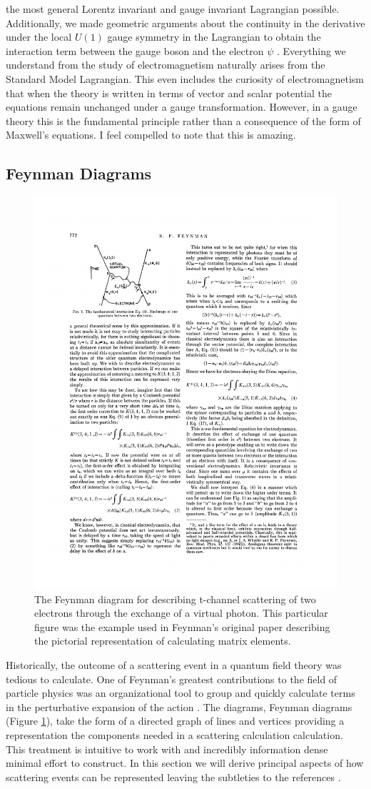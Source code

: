 the most general Lorentz invariant and gauge invariant Lagrangian possible. Additionally, we made geometric arguments about the continuity
  in the derivative under the local $U(1)$ gauge symmetry in the Lagrangian to obtain the interaction term between 
the gauge boson and the electron $\psi$ . Everything 
we understand from the study of electromagnetism naturally 
arises from the Standard Model Lagrangian. This even includes 
the curiosity of electromagnetism that when the theory is written in terms of vector and scalar potential the equations remain
 unchanged under a gauge transformation. However, in a gauge theory 
this is the fundamental principle rather than a consequence of the form of Maxwell's equations. I feel compelled to note that this is amazing. 

\subsection{Feynman Diagrams}
\begin{figure}
\begin{center}
\includegraphics[width=.450\textwidth]{pics/first_diagram}
\end{center}
\caption{The Feynman diagram for describing t-channel scattering of two electrons through
the exchange of a virtual photon. This particular figure
 was the example used in Feynman's original paper describing the pictorial representation of calculating matrix elements.}
\label{fig:first_diagram}
\end{figure}
Historically, the outcome of a scattering event in a quantum field theory was
 tedious to calculate. One of Feynman's greatest contributions to the field of
 particle physics was an organizational tool to group and quickly calculate terms 
in the perturbative expansion of the action \cite{feynman}. The diagrams, Feynman diagrams (Figure \ref{fig:first_diagram}), 
take the form of a directed graph of lines and vertices providing a  representation
the components needed in a scattering calculation calculation. This treatment is
intuitive to work with and incredibly information dense minimal effort to construct. 
In this section we will derive principal aspects of how scattering events can be represented leaving the subtleties to the references \cite{peskin,Srednicki}.


